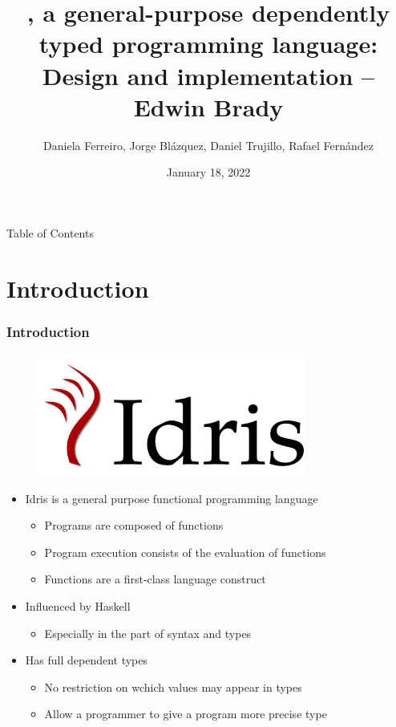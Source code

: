 \documentclass{beamer}
\title{\Idris, a general-purpose dependently typed programming language: Design and implementation -- Edwin Brady}
\author{Daniela Ferreiro, Jorge Blázquez, Daniel Trujillo, Rafael Fernández}
\date{January 18, 2022}
\begin{document}
\frame{\titlepage}

\begin{frame}{Table of Contents}
	\tableofcontents
\end{frame}
\newcommand{\intro}{Introduction}
\section{\intro}
\label{sec:intro}

\begin{frame}
	\frametitle{\intro}
	\begin{figure}
		\includegraphics[width=0.3\linewidth]{idris.png}
		\label{fig:boat1}
	\end{figure}
	\begin{itemize}
		\setlength\itemsep{1em} 
		\item Idris is a general purpose functional programming language
		\begin{itemize}
			\item Programs are composed of functions
			\item Program execution consists of the evaluation of functions
			\item Functions are a first-class language construct
		\end{itemize}  
		\item Influenced by Haskell
		\begin{itemize}
			\item Especially in the part of syntax and types
		\end{itemize}   
		\item Has full dependent types
		\begin{itemize}
			\item No restriction on wchich values may appear in types
			\item Allow a programmer to give a program more precise type
		\end{itemize}   
	\end{itemize}
\end{frame}

\newcommand{\dependentTypes}{Dependent Types - Examples}
\end{document}
